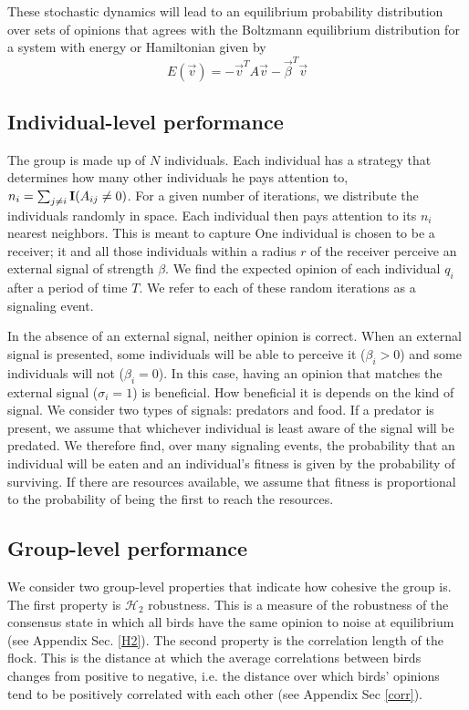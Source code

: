 \documentclass{article}
\begin{document}
These stochastic dynamics will lead to an equilibrium probability distribution over sets of opinions that agrees with the Boltzmann equilibrium distribution for a system with energy or Hamiltonian given by 
\begin{equation*}
E(\vec{v})=-\vec{v}^TA\vec{v}-\vec{\beta}^T\vec{v}
\end{equation*}  

\subsection{Individual-level performance }
The group is made up of $N$ individuals.  Each individual has a strategy that determines how many other individuals he pays attention to, $n_i=\sum_{j\neq i}{\bf I}(A_{ij}\neq 0)$.  For a given number of iterations, we distribute the individuals randomly in space.  Each individual then pays attention to its $n_i$ nearest neighbors.  This is meant to capture One individual is chosen to be a receiver; it and all those individuals within a radius $r$ of the receiver perceive an external signal of strength $\beta$.  We find the expected opinion of each individual $q_i$ after a period of time $T$.  We refer to each of these random iterations as a signaling event.

In the absence of an external signal, neither opinion is correct.  When an external signal is presented, some individuals will be able to perceive it ($\beta_i>0$) and some individuals will not ($\beta_i=0$).  In this case, having an opinion that matches the external signal ($\sigma_i=1$) is beneficial.  How beneficial it is depends on the kind of signal.  We consider two types of signals: predators and food.  If a predator is present, we assume that whichever individual is least aware of the signal will be predated.  We therefore find, over many signaling events, the probability that an individual will be eaten and an individual's fitness is given by the probability of surviving.  If there are resources available, we assume that fitness is proportional to the probability of being the first to reach the resources. 

\subsection{Group-level performance }
We consider two group-level properties that indicate how cohesive the group is.  The first property is $\mathscr{H}_2$ robustness. This is a measure of the robustness of the consensus state in which all birds have the same opinion to noise at equilibrium (see Appendix Sec. \ref{H2}). The second property is the correlation length of the flock. This is the distance at which the average correlations between birds changes from positive to negative, i.e. the distance over which birds' opinions tend to be positively correlated with each other (see Appendix Sec \ref{corr}).
\end{document}
